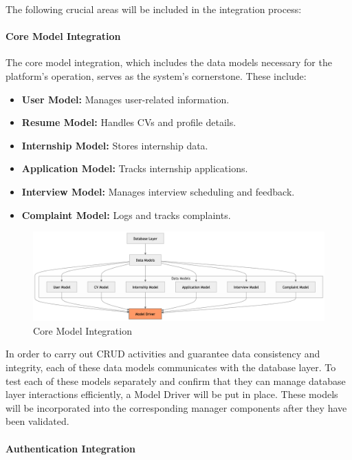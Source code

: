 The following crucial areas will be included in the integration process:

\paragraph{Core Model Integration}

The core model integration, which includes the data models necessary for the platform's operation, serves as the system's cornerstone. These include:
\begin{itemize}
    \item \textbf{User Model:} Manages user-related information.
    \item \textbf{Resume Model:} Handles CVs and profile details.
    \item \textbf{Internship Model:} Stores internship data.
    \item \textbf{Application Model:} Tracks internship applications.
    \item \textbf{Interview Model:} Manages interview scheduling and feedback.
    \item \textbf{Complaint Model:} Logs and tracks complaints.
\end{itemize}
\begin{figure}[H]
    \begin{center}
        \includegraphics[width=0.79\linewidth]{JhaBhatiaSharma/imagesDD/CoreModelIntegration.png}
        \caption{Core Model Integration}
        \label{fig:coreModelIntegration}
    \end{center}
\end{figure}
In order to carry out CRUD activities and guarantee data consistency and integrity, each of these data models communicates with the database layer. To test each of these models separately and confirm that they can manage database layer interactions efficiently, a Model Driver will be put in place. These models will be incorporated into the corresponding manager components after they have been validated.

\paragraph{Authentication Integration}

